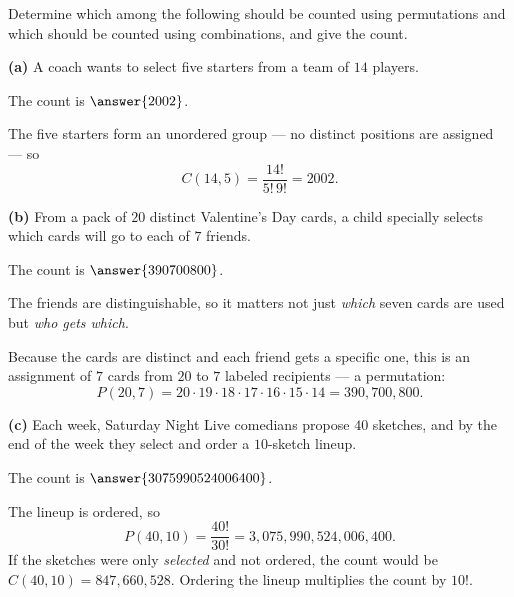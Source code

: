 \documentclass[12pt]{ximera}
\begin{document}
\begin{problem}
Determine which among the following should be counted using permutations and which
should be counted using combinations, and give the count.

\begin{prompt}
\textbf{(a)} A coach wants to select five starters from a team of $14$ players.

\begin{multipleChoice}
\end{multipleChoice}

The count is $\answer{2002}$.

\begin{feedback}
The five starters form an unordered group --- no distinct positions are assigned --- so
\[ C(14,5)=\frac{14!}{5!\,9!}=2002. \]
\end{feedback}
\end{prompt}

\begin{prompt}
\textbf{(b)} From a pack of $20$ distinct Valentine's Day cards, a child specially
selects which cards will go to each of $7$ friends.

\begin{multipleChoice}
\end{multipleChoice}

The count is $\answer{390700800}$.

\begin{hint}
The friends are distinguishable, so it matters not just \emph{which} seven cards are
used but \emph{who gets which}.
\end{hint}

\begin{feedback}
Because the cards are distinct and each friend gets a specific one, this is an
assignment of $7$ cards from $20$ to $7$ labeled recipients --- a permutation:
\[ P(20,7)=20\cdot 19\cdot 18\cdot 17\cdot 16\cdot 15\cdot 14 = 390{,}700{,}800. \]
\end{feedback}
\end{prompt}

\begin{prompt}
\textbf{(c)} Each week, Saturday Night Live comedians propose $40$ sketches, and by
the end of the week they select and order a $10$-sketch lineup.

\begin{multipleChoice}
\end{multipleChoice}

The count is $\answer{3075990524006400}$.

\begin{feedback}
The lineup is ordered, so
\[ P(40,10)=\frac{40!}{30!}=3{,}075{,}990{,}524{,}006{,}400. \]
If the sketches were only \emph{selected} and not ordered, the count would be $C(40,10)=847{,}660{,}528$. Ordering the
lineup multiplies the count by $10!$.
\end{feedback}
\end{prompt}
\end{problem}
\end{document}
